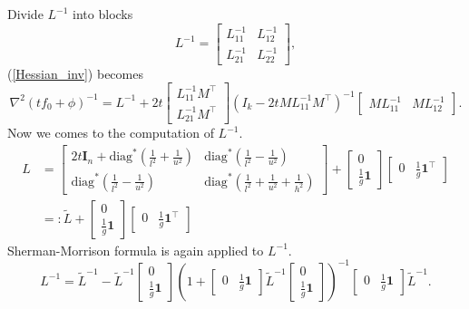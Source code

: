 \documentclass[final,onefignum,onetabnum]{siamart190516}
\begin{document}
Divide $L^{-1}$ into blocks
\begin{equation}\label{L_inv_block}
    L^{-1} = \begin{bmatrix} L^{-1}_{11} &L^{-1}_{12}\\
    L^{-1}_{21} &L^{-1}_{22}\end{bmatrix},
\end{equation}
(\ref{Hessian_inv}) becomes
\begin{equation}\label{H_inv}
    \nabla^2(tf_0+\phi)^{-1} = L^{-1} + 
    2t\begin{bmatrix} L^{-1}_{11}M^\top \\ L^{-1}_{21}M^\top\end{bmatrix}
    (I_k-2t M L^{-1}_{11} M^\top)^{-1}\begin{bmatrix} M L^{-1}_{11} &M L^{-1}_{12}\end{bmatrix}.
\end{equation}
Now we comes to the computation of $L^{-1}$.
\begin{equation}
    \begin{aligned}
        L &= \begin{bmatrix} 2t\mathbf{I}_n + \text{diag}^*(\frac{1}{l^2}+\frac{1}{u^2}) &  \text{diag}^*(\frac{1}{l^2}-\frac{1}{u^2})\\
\text{diag}^*(\frac{1}{l^2}-\frac{1}{u^2}) &  \text{diag}^*(\frac{1}{l^2}+\frac{1}{u^2}+\frac{1}{h^2}) \end{bmatrix}+ \begin{bmatrix}
0\\ \frac{1}{g}\mathbf{1}
\end{bmatrix} \begin{bmatrix}
0 &\frac{1}{g}\mathbf{1}^\top
\end{bmatrix}\\
&=: \widetilde{L} + \begin{bmatrix}
0\\ \frac{1}{g}\mathbf{1}
\end{bmatrix} \begin{bmatrix}
0 &\frac{1}{g}\mathbf{1}^\top
\end{bmatrix}
    \end{aligned}
\end{equation}
Sherman-Morrison formula is again applied to $L^{-1}$.
\begin{equation}\label{L_inv}
    L^{-1} = \widetilde{L}^{-1}- \widetilde{L}^{-1}\begin{bmatrix}
0\\ \frac{1}{g}\mathbf{1}
\end{bmatrix}(1+\begin{bmatrix}
0 &\frac{1}{g}\mathbf{1}
\end{bmatrix}\widetilde{L}^{-1}\begin{bmatrix}
0\\ \frac{1}{g}\mathbf{1}
\end{bmatrix})^{-1}\begin{bmatrix}
0 &\frac{1}{g}\mathbf{1}
\end{bmatrix}\widetilde{L}^{-1}.
\end{equation}
\end{document}
